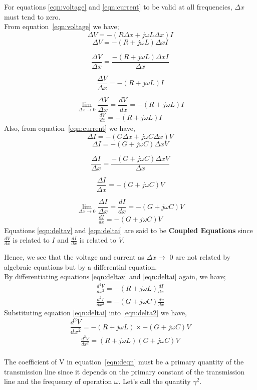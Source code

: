 For equations \ref{eqn:voltage} and \ref{eqn:current} to be valid at all frequencies, $ \Delta x $ must tend to zero.\\
From equation~\ref{eqn:voltage} we have;
\[ \Delta V = - (R \Delta x + j\omega L\Delta x)I \]
\[ \Delta V = - (R + j\omega L)\Delta x I \]

\[ \frac{	\Delta V }{\Delta x} = \frac{ - (R  + j\omega L)\Delta x I}{\Delta x} \]

\[ \frac{	\Delta V }{\Delta x} =  - (R  + j\omega L) I \]

\[ \lim_{ \Delta x\to 0} \frac{\Delta V}{ \Delta x} = \frac{ dV}{ \ dx} = - (R + j \omega L)I \]
 \begin{align}
\frac{ dV}{ \ dx} = - (R + j \omega L)I 
\label{eqn:deltav}
 \end{align} 
Also, from equation~\ref{eqn:current} we have,
\[ \Delta I = - (G \Delta x + j\omega C\Delta x)V \]
\[ \Delta I = - (G + j\omega C)\Delta x V \]

\[ \frac{	\Delta I }{\Delta x} = \frac{ - (G + j\omega C)\Delta x V}{\Delta x} \]
   
\[ \frac{	\Delta I }{\Delta x} =  - (G + j\omega C) V \]
   
\[ \lim_{ \Delta x\to 0}	\frac{ \Delta I}{ \Delta x} = \frac{dI}{dx} = - (G + j\omega C)V \]
\begin{align}
\frac{dI}{dx} = - (G + j\omega C)V 
\label{eqn:deltai}
\end{align}
Equations \ref{eqn:deltav} and \ref{eqn:deltai} are said to be \textbf{Coupled Equations} since $ \frac{dV}{dx} $ is related to $I$ and $ \frac{dI}{dx} $  is related to $V$.

Hence, we see that the voltage and current as $ \Delta x \rightarrow $ 0 are not related by algebraic equations but by a differential equation.\\
By differentiating equations \ref{eqn:deltav} and \ref{eqn:deltai} again, we have; 
\begin{align}
\frac{d^{2}V}{dx^{2}} = - (R + j\omega L)\frac{dI}{dx} 
\label{eqn:delta2v}
\end{align}
\begin{align}
\frac{d^{2}I}{dx^{2}} = - (G + j\omega C)\frac{dv}{dx}
\label{eqn:delta2i}
\end{align}
Substituting equation \ref{eqn:deltai} into \ref{eqn:delta2} we have,
\[ 	\frac{d^{2}V}{dx^{2}} = - (R + j\omega L)\times {- (G + j\omega C)V} \]
\begin{align}
 \frac{d^{2}V}{dx^{2}} = (R + j\omega L)(G + j\omega C)V 
\label{eqn:deqn}
\end{align}   
\\
The coefficient of V in equation~\ref{eqn:deqn} must be a primary quantity of the transmission line since it depends on the primary constant of the transmission line and the frequency of operation $ \omega$. Let's call the quantity $ \gamma^{2}. $ 

